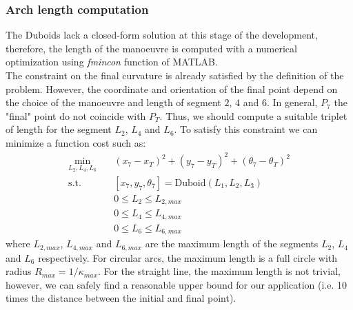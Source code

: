 \documentclass[11pt,twocolumn]{scrartcl}
\begin{document}
\subsubsection*{Arch length computation}
The Duboids lack a closed-form solution at this stage of the development, therefore, the length of the manoeuvre is computed with a numerical optimization using \textit{fmincon} function of MATLAB.\\
The constraint on the final curvature is already satisfied by the definition of the problem. However, the coordinate and orientation of the final point depend on the choice of the manoeuvre and length of segment $2$, $4$ and $6$.
In general, $P_7$ the "final" point do not coincide with $P_T$. Thus, we should compute a suitable triplet of length for the segment $L_2$, $L_4$ and $L_6$. To satisfy this constraint we can minimize a function cost such as:
%
\begin{equation}
  \label{eq:costfunction}
  \begin{split}
    \min_{L_2,L_4,L_6} \quad & (x_7-x_T)^2 + (y_7-y_T)^2 + (\theta_7-\theta_T)^2\\
    \text{s.t.} \quad & [x_7,y_7,\theta_7] = \mathrm{Duboid}(L_1,L_2,L_3)\\
    & 0 \leq L_2 \leq L_{2,max}\\
    & 0 \leq L_4 \leq L_{4,max}\\
    & 0 \leq L_6 \leq L_{6,max}
  \end{split}
\end{equation}
%
where $L_{2,max}$, $L_{4,max}$ and $L_{6,max}$ are the maximum length of the segments $L_2$, $L_4$ and $L_6$ respectively. For circular arcs, the maximum length is a full circle with radius $R_{max}=1/\kappa_{max}$. For the straight line, the maximum length is not trivial, however, we can safely find a reasonable upper bound for our application (i.e. 10 times the distance between the initial and final point).
%
\end{document}

